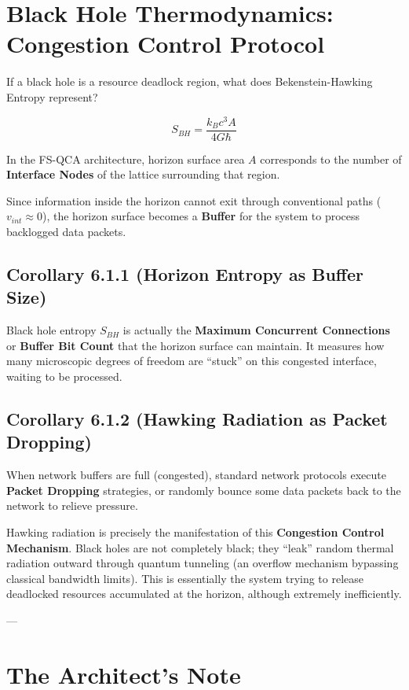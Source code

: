 \documentclass[11pt,a4paper,twoside]{book}
\begin{document}
\section{Black Hole Thermodynamics: Congestion Control Protocol}

If a black hole is a resource deadlock region, what does Bekenstein-Hawking Entropy represent?

$$S_{BH} = \frac{k_B c^3 A}{4 G \hbar}$$

In the FS-QCA architecture, horizon surface area \textbf{$A$} corresponds to the number of \textbf{Interface Nodes} of the lattice surrounding that region.

Since information inside the horizon cannot exit through conventional paths (\textbf{$v_{int} \approx 0$}), the horizon surface becomes a \textbf{Buffer} for the system to process backlogged data packets.

\subsection{Corollary 6.1.1 (Horizon Entropy as Buffer Size)}

Black hole entropy \textbf{$S_{BH}$} is actually the \textbf{Maximum Concurrent Connections} or \textbf{Buffer Bit Count} that the horizon surface can maintain. It measures how many microscopic degrees of freedom are ``stuck'' on this congested interface, waiting to be processed.

\subsection{Corollary 6.1.2 (Hawking Radiation as Packet Dropping)}

When network buffers are full (congested), standard network protocols execute \textbf{Packet Dropping} strategies, or randomly bounce some data packets back to the network to relieve pressure.

Hawking radiation is precisely the manifestation of this \textbf{Congestion Control Mechanism}. Black holes are not completely black; they ``leak'' random thermal radiation outward through quantum tunneling (an overflow mechanism bypassing classical bandwidth limits). This is essentially the system trying to release deadlocked resources accumulated at the horizon, although extremely inefficiently.

---

\section{The Architect's Note}
\end{document}
